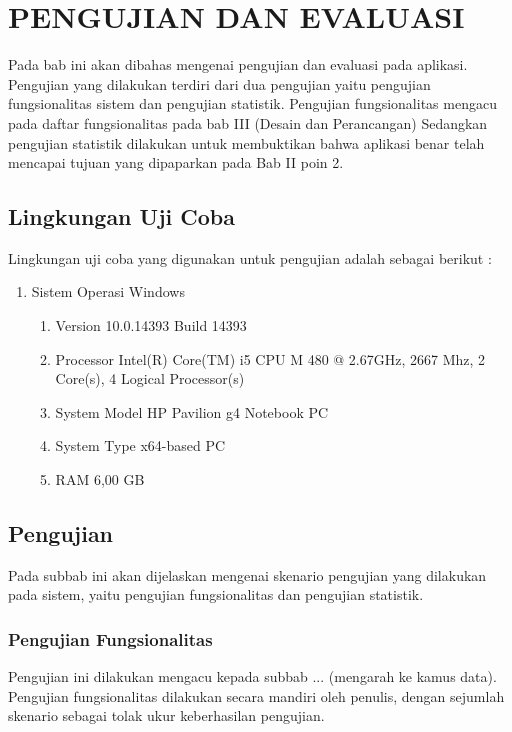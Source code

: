 \chapter{PENGUJIAN DAN EVALUASI}

	Pada bab ini akan dibahas mengenai pengujian dan evaluasi pada aplikasi. Pengujian yang dilakukan terdiri dari dua pengujian yaitu pengujian fungsionalitas sistem dan pengujian statistik. Pengujian fungsionalitas mengacu pada daftar fungsionalitas pada bab III (Desain dan Perancangan) Sedangkan pengujian statistik dilakukan untuk membuktikan bahwa aplikasi benar telah mencapai tujuan yang dipaparkan pada Bab II poin 2.
    
	\section{Lingkungan Uji Coba}
    Lingkungan uji coba yang digunakan untuk pengujian adalah sebagai berikut :
    \begin{enumerate}
    \item Sistem Operasi Windows
    	\label{env_uji1}
    	\begin{enumerate}[label=(\alph*)]
        \item Version	10.0.14393 Build 14393
        \item Processor	Intel(R) Core(TM) i5 CPU       M 480  @ 2.67GHz, 2667 Mhz, 2 Core(s), 4 Logical Processor(s)
        \item System Model	HP Pavilion g4 Notebook PC
		\item System Type	x64-based PC
        \item RAM 6,00 GB
        \end{enumerate}
    \end{enumerate}
    
    \section{Pengujian}
    
      Pada subbab ini akan dijelaskan mengenai skenario pengujian yang dilakukan pada sistem, yaitu pengujian fungsionalitas dan pengujian statistik.
      \subsection{Pengujian Fungsionalitas}
      Pengujian ini dilakukan mengacu kepada subbab ... (mengarah ke kamus data). Pengujian fungsionalitas dilakukan secara mandiri oleh penulis, dengan sejumlah skenario sebagai tolak ukur keberhasilan pengujian.
